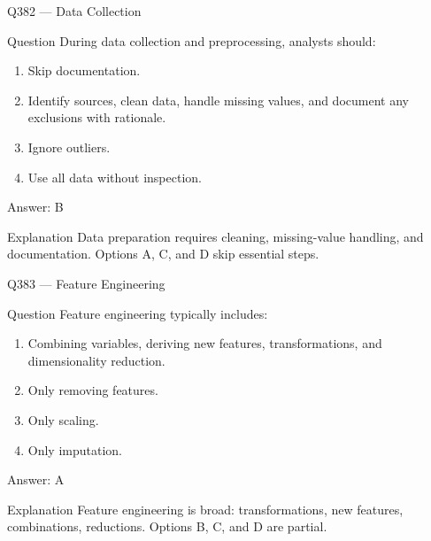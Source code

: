 \documentclass[aspectratio=169,8pt]{beamer}
\begin{document}
	\begin{frame}{Q382 --- Data Collection}
		\begin{block}{Question}
			During data collection and preprocessing, analysts should:
			\begin{enumerate}
				\item Skip documentation.
				\item Identify sources, clean data, handle missing values, and document any exclusions with rationale.
				\item Ignore outliers.
				\item Use all data without inspection.
			\end{enumerate}
		\end{block}
		\begin{exampleblock}{Answer: B}\end{exampleblock}
		\begin{block}{Explanation}
			Data preparation requires cleaning, missing-value handling, and documentation. Options A, C, and D skip essential steps.
		\end{block}
	\end{frame}
	
	\begin{frame}{Q383 --- Feature Engineering}
		\begin{block}{Question}
			Feature engineering typically includes:
			\begin{enumerate}
				\item Combining variables, deriving new features, transformations, and dimensionality reduction.
				\item Only removing features.
				\item Only scaling.
				\item Only imputation.
			\end{enumerate}
		\end{block}
		\begin{exampleblock}{Answer: A}\end{exampleblock}
		\begin{block}{Explanation}
			Feature engineering is broad: transformations, new features, combinations, reductions. Options B, C, and D are partial.
		\end{block}
	\end{frame}
	
\end{document}
